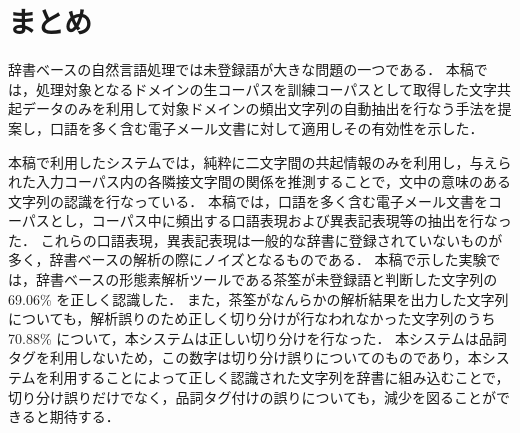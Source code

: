 \section{まとめ}
辞書ベースの自然言語処理では未登録語が大きな問題の一つである．
本稿では，処理対象となるドメインの生コーパスを訓練コーパスとして取得した文字共起データのみを利用して対象ドメインの頻出文字列の自動抽出を行なう手法を提案し，口語を多く含む電子メール文書に対して適用しその有効性を示した．

本稿で利用したシステムでは，純粋に二文字間の共起情報のみを利用し，与えられた入力コーパス内の各隣接文字間の関係を推測することで，文中の意味のある文字列の認識を行なっている．
本稿では，口語を多く含む電子メール文書をコーパスとし，コーパス中に頻出する口語表現および異表記表現等の抽出を行なった．
これらの口語表現，異表記表現は一般的な辞書に登録されていないものが多く，辞書ベースの解析の際にノイズとなるものである．
本稿で示した実験では，辞書ベースの形態素解析ツールである茶筌が未登録語と判断した文字列の 69.06\% を正しく認識した．
また，茶筌がなんらかの解析結果を出力した文字列についても，解析誤りのため正しく切り分けが行なわれなかった文字列のうち 70.88\% について，本システムは正しい切り分けを行なった．
本システムは品詞タグを利用しないため，この数字は切り分け誤りについてのものであり，本システムを利用することによって正しく認識された文字列を辞書に組み込むことで，切り分け誤りだけでなく，品詞タグ付けの誤りについても，減少を図ることができると期待する．


\nocite{nobesawa00coling}
\begin{biography}
\end{biography}

